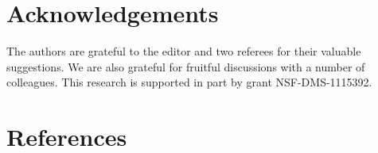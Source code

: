 \documentclass[]{elsarticle}
\theoremstyle{definition}
\theoremstyle{remark}
\begin{document}
\section{Acknowledgements}  The authors are grateful to the editor and two referees for their valuable suggestions.  We are also grateful for fruitful discussions with a number of colleagues. This research is supported in part by grant NSF-DMS-1115392.

\section*{References}

%

\end{document}
